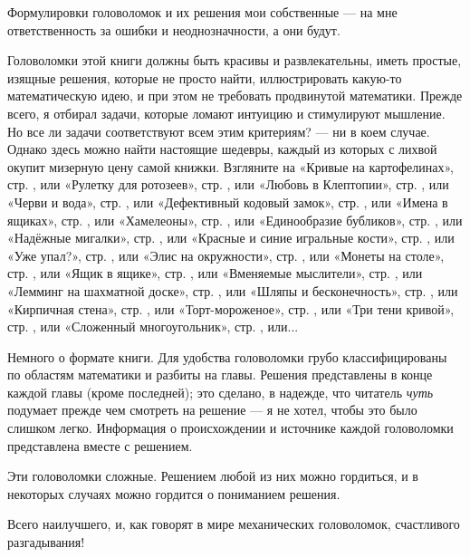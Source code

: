 Формулировки головоломок и их решения мои собственные --- на мне ответственность за ошибки и неоднозначности,
а они будут.

Головоломки этой книги должны быть красивы и развлекательны,
иметь простые, изящные решения, которые не просто найти,
иллюстрировать какую-то математическую идею,
и при этом не требовать продвинутой математики.
Прежде всего, я отбирал задачи, которые ломают интуицию и стимулируют мышление.
Но все ли задачи соответствуют всем этим критериям? --- ни в коем случае.
Однако здесь можно найти настоящие шедевры, каждый из которых с лихвой окупит мизерную цену самой книжки.
Взгляните на
«Кривые на картофелинах», стр. \pageref{Кривые на картофелинах}, или
«Рулетку для ротозеев», стр. \pageref{Рулетка для ротозеев}, или
«Любовь в Клептопии», стр. \pageref{Любовь в Клептопии}, или
«Черви и вода», стр. \pageref{Черви и вода}, или
«Дефективный кодовый замок», стр. \pageref{Дефективный кодовый замок}, или
«Имена в ящиках», стр. \pageref{Имена в ящиках}, или
«Хамелеоны», стр. \pageref{Хамелеоны}, или
«Единообразие бубликов», стр. \pageref{Единообразие бубликов}, или
«Надёжные мигалки», стр. \pageref{Надёжные мигалки}, или
«Красные и синие игральные кости», стр. \pageref{Красные и синие игральные кости}, или
«Уже упал?», стр. \pageref{Уже упал?}, или
«Элис на окружности», стр. \pageref{Элис на окружности}, или
«Монеты на столе», стр. \pageref{Монеты на столе}, или
«Ящик в ящике», стр. \pageref{Ящик в ящике}, или
«Вменяемые мыслители», стр. \pageref{Вменяемые мыслители}, или
«Лемминг на шахматной доске», стр. \pageref{Лемминг на шахматной доске}, или
«Шляпы и бесконечность», стр. \pageref{Шляпы и бесконечность}, или
«Кирпичная стена», стр. \pageref{Кирпичная стена}, или
«Торт-мороженое», стр. \pageref{Торт-мороженое}, или
«Три тени кривой», стр. \pageref{Три тени кривой}, или
«Сложенный многоугольник», стр. \pageref{Сложенный многоугольник}, или...

Немного о формате книги.
Для удобства головоломки грубо классифицированы по областям математики и
разбиты на главы.
Решения представлены в конце каждой главы (кроме последней);
это сделано, в надежде, что читатель \emph{чуть} подумает прежде чем смотреть на решение --- я не хотел, чтобы это было слишком легко.
Информация о происхождении и источнике каждой головоломки представлена вместе с решением.

Эти головоломки сложные.
Решением любой из них можно гордиться, и в некоторых случаях можно гордится о пониманием решения.

Всего наилучшего, и, как говорят в мире механических головоломок, счастливого разгадывания!

